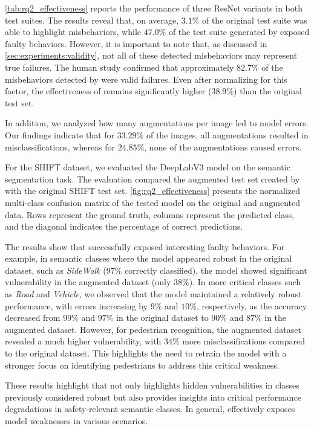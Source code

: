 \autoref{tab:rq2_effectiveness} reports the performance of three ResNet variants in both test suites. The results reveal that, on average, $3.1\%$ of the original test suite was able to highlight misbehaviors, while $47.0\%$
of the test suite generated by \approach exposed faulty behaviors. However, it is important to note that, as discussed in \autoref{sec:experiments:validity}, not all of these detected misbehaviors may represent true failures. The human study confirmed that approximately $82.7\%$ of the misbehaviors detected by \approach were valid failures. Even after normalizing for this factor, the effectiveness of \approach remains significantly higher ($38.9\%$) than the original test set.

In addition, we analyzed how many augmentations per image led to model errors. Our findings indicate that for $33.29\%$ of the images, all augmentations resulted in misclassifications, whereas for $24.85\%$, none of the augmentations caused errors.

For the SHIFT dataset, we evaluated the DeepLabV3 model on the semantic segmentation task. The evaluation compared the augmented test set created by \approach with the original SHIFT test set. \autoref{fig:rq2_effectiveness} presents the normalized multi-class confusion matrix of the tested model on the original and augmented data. Rows represent the ground truth, columns represent the predicted class, and the diagonal indicates the percentage of correct predictions.

The results show that \approach successfully exposed interesting faulty behaviors. For example, in semantic classes where the model appeared robust in the original dataset, such as \textit{SideWalk} ($97\%$ correctly classified), the model showed significant vulnerability in the augmented dataset (only $38\%$). In more critical classes such as \textit{Road} and \textit{Vehicle}, we observed that the model maintained a relatively robust performance, with errors increasing by $9\%$ and $10\%$, respectively, as the accuracy decreased from $99\%$ and $97\%$ in the original dataset to $90\%$ and $87\%$ in the augmented dataset. However, for pedestrian recognition, the augmented dataset revealed a much higher vulnerability, with $34\%$ more misclassifications compared to the original dataset. This highlights the need to retrain the model with a stronger focus on identifying pedestrians to address this critical weakness.

These results highlight that \approach not only highlights hidden vulnerabilities in classes previously considered robust but also provides insights into critical performance degradations in safety-relevant semantic classes. In general, \approach effectively exposes model weaknesses in various scenarios.

